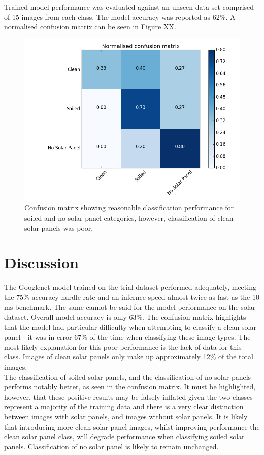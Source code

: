 \documentclass[10pt,journal,compsoc]{IEEEtran}
\begin{document}
		Trained model performance was evaluated against an unseen data set comprised of 15 images from each class. The model accuracy was reported as 62\%. A normalised confusion matrix can be seen in Figure XX.
		\begin{figure}[h]
			\centering
			\includegraphics[scale=0.37]{confusion_matrix}
			\caption{Confusion matrix showing reasonable classification performance for soiled and no solar panel categories, however, classification of clean solar panels was poor.}
		\end{figure}
			
		\section{Discussion}
		The Googlenet model trained on the trial dataset performed adequately, meeting the 75\% accuracy hurdle rate and an infernce speed almost twice as fast as the 10$\si{\milli\second}$ benchmark. The same cannot be said for the model performance on the solar dataset. Overall model accuracy is only 63\%. The confusion matrix highlights that the model had particular difficulty when attempting to classify a clean solar panel - it was in error 67\% of the time when classifying these image types. The most likely explanation for this poor performance is the lack of data for this class. Images of clean solar panels only make up approximately 12\% of the total images.\\
		
		The classification of soiled solar panels, and the classification of no solar panels performs notably better, as seen in the confusion matrix. It must be highlighted, however, that these positive results may be falsely inflated given the two classes represent a majority of the training data and there is a very clear distinction between images with solar panels, and images without solar panels. It is likely that introducing more clean solar panel images, whilst improving performance the clean solar panel class, will degrade performance when classifying soiled solar panels. Classification of no solar panel is likely to remain unchanged.\\
		
\end{document}
